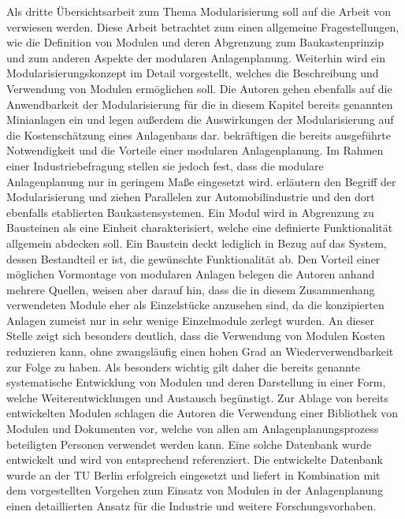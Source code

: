 Als dritte \"Ubersichtsarbeit zum Thema Modularisierung soll auf die Arbeit  von \citeauthor{Hady_2012} \cite{Hady_2012} verwiesen werden. Diese Arbeit betrachtet zum einen allgemeine Fragestellungen, wie die Definition von Modulen und deren Abgrenzung zum Baukastenprinzip und zum anderen Aspekte der modularen Anlagenplanung. Weiterhin wird ein Modularisierungskonzept im Detail vorgestellt, welches die Beschreibung und Verwendung von Modulen erm\"oglichen soll. Die Autoren gehen ebenfalls auf die Anwendbarkeit der Modularisierung f\"ur die in diesem Kapitel bereits genannten Minianlagen ein und legen au\ss{}erdem die Auswirkungen der Modularisierung auf die Kostensch\"atzung eines Anlagenbaus dar.\newline
\citeauthor{Hady_2012} bekr\"aftigen die bereits ausgef\"uhrte Notwendigkeit und die Vorteile einer modularen Anlagenplanung. Im Rahmen einer Industriebefragung stellen sie jedoch fest, dass die modulare Anlagenplanung nur in geringem Ma\ss{}e eingesetzt wird. \citeauthor{Hady_2012} erl\"autern den Begriff der Modularisierung und ziehen Parallelen zur Automobilindustrie und den dort ebenfalls etablierten Baukastensystemen. Ein Modul wird in Abgrenzung zu Bausteinen als eine Einheit charakterisiert, welche eine definierte Funktionalit\"at allgemein abdecken soll. Ein Baustein deckt lediglich in Bezug auf das System, dessen Bestandteil er ist, die gew\"unschte Funktionalit\"at ab. \newline
Den Vorteil einer m\"oglichen Vormontage von modularen Anlagen belegen die Autoren anhand mehrere Quellen, weisen aber darauf hin, dass die in diesem Zusammenhang verwendeten Module  eher als Einzelst\"ucke anzusehen sind, da die konzipierten Anlagen zumeist nur in sehr wenige Einzelmodule zerlegt wurden. An dieser Stelle zeigt sich besonders deutlich, dass die Verwendung von Modulen Kosten reduzieren kann, ohne zwangsl\"aufig einen hohen Grad an Wiederverwendbarkeit zur Folge zu haben. Als besonders wichtig gilt daher die bereits genannte systematische Entwicklung von Modulen und deren Darstellung in einer Form, welche Weiterentwicklungen und Austausch beg\"unstigt. \newline
Zur Ablage von bereits entwickelten Modulen schlagen die Autoren die Verwendung einer Bibliothek von Modulen und Dokumenten vor, welche von allen am Anlagenplanungsprozess beteiligten Personen verwendet werden kann. Eine solche Datenbank wurde entwickelt und wird von \citeauthor{Hady_2012} entsprechend referenziert. Die entwickelte Datenbank wurde an der TU Berlin erfolgreich eingesetzt und liefert in Kombination mit dem vorgestellten Vorgehen zum Einsatz von Modulen in der Anlagenplanung einen detaillierten Ansatz f\"ur die Industrie und weitere Forschungsvorhaben. \cite{Hady_2012}

